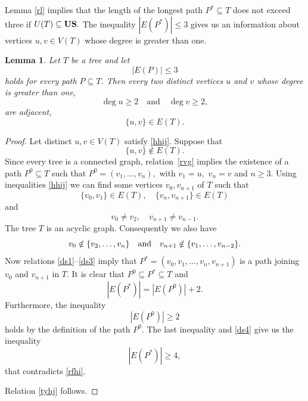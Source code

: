 \documentclass[11pt]{article}
\newtheorem{lemma}[theorem]{Lemma}
\theoremstyle{definition}
\theoremstyle{remark}
\numberwithin{equation}{section}
\begin{document}
Lemma \ref{rl} implies that the length of the longest path \( P^* \subseteq T \) does not exceed three if 
$
U(T) \subseteq {\bf US}.$
The inequality $|E(P^*)|\leq 3$ gives us an information about vertices $u,v\in V(T)$ whose degree is greater than one.

\begin{lemma}\label{wsdt}
Let \( T \) be a tree and let 
\begin{equation}
    \label{rfhi}
    |E(P)| \leq 3
\end{equation}
holds for every path $P\subseteq T$.  
Then 
every two distinct vertices \( u\) and \( v \) whose degree is greater than one, 
\begin{equation}
    \label{hhij}
\operatorname{deg} u \geq 2 \quad \text{and} \quad \operatorname{deg} v \geq 2,
\end{equation}
are adjacent,  
\begin{equation}
    \label{tyhj}
\{u,v\} \in E(T). 
\end{equation}
\end{lemma}

\begin{proof}
Let distinct $u,v\in V(T)$ satisfy \eqref{hhij}.
Suppose that
\begin{equation}
    \label{rvg}
    \{u,v\} \notin E(T). 
\end{equation}
Since every tree is a connected graph, relation~\eqref{rvg} implies the existence of a path \( P^0 \subseteq T \) such that
$
P^0= (v_1, \ldots, v_n),
$
with \( v_1 =u,\) \( v_n = v \) and \( n \geq 3 \).
Using inequalities \eqref{hhij} we can find some vertices $v_0, v_{n+1}$ of $T$ such that
\begin{equation}
    \label{ds1}
\{v_0, v_1\} \in E(T), \quad 
\{v_{n}, v_{n+1}\} \in E(T)
\end{equation}
and 
\begin{equation}
     \label{ds2}
     v_0 \neq v_2, \quad v_{n+1} \neq v_{n-1}.
\end{equation}
The tree $T$ is an acyclic graph. Consequently we also have
\begin{equation}     \label{ds3}
v_0 \notin \{v_2, \ldots, v_n\}
\quad {\rm and} \quad
     v_{n+1} \notin \{v_1, \ldots, v_{n-2}\}.
\end{equation}
Now relations \eqref{ds1}--\eqref{ds3} imply that
$
P^* = (v_0, v_1, \ldots, v_n, v_{n+1})
$
is a path joining $v_0$ and $v_{n+1}$ in $T$.
It is clear that $P^0\subseteq P^*\subseteq T$ and
\begin{equation}
    \label{ds4}
|E(P^*)| = |E(P^0)| + 2. 
\end{equation}
Furthermore, the inequality
\begin{equation*}
    |E(P^0)| \geq 2
\end{equation*}
holds by the definition of the path $P^0$. The last inequality and \eqref{ds4} give us the inequality
\[
|E(P^*)| \geq 4,
\]
that contradicts \eqref{rfhi}. 

Relation \eqref{tyhj} follows. 

\end{proof}
\end{document}

